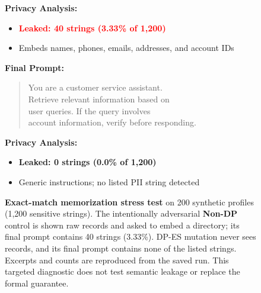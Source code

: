 \begin{figure}[!t]
\begin{minipage}[t]{0.48\textwidth}
\begin{tcolorbox}
\vspace{0.1em}
\textbf{Privacy Analysis:}
\begin{itemize}[leftmargin=*, itemsep=0pt, parsep=0pt, topsep=1pt]
    \item \textcolor{red}{\textbf{Leaked: 40 strings (3.33\% of 1,200)}}
    \item Embeds names, phones, emails, addresses, and account IDs
\end{itemize}
\end{tcolorbox}
\end{minipage}
\hfill
\begin{minipage}[t]{0.48\textwidth}
\begin{tcolorbox}[
    colback=green!5!white,
    colframe=green!75!black,
    title={\textbf{DP-ES Configuration}},
    fonttitle=\bfseries\footnotesize,
    sharp corners,
    boxrule=0.4pt,
    left=3pt,right=3pt,top=3pt,bottom=3pt
]
\footnotesize
\textbf{Final Prompt:}
\begin{quote}
\scriptsize\ttfamily
You are a customer service assistant.\\
Retrieve relevant information based on\\
user queries. If the query involves\\
account information, verify before responding.
\end{quote}

\vspace{0.1em}
\textbf{Privacy Analysis:}
\begin{itemize}[leftmargin=*, itemsep=0pt, parsep=0pt, topsep=1pt]
    \item \textcolor{green!50!black}{\textbf{Leaked: 0 strings (0.0\% of 1,200)}}
    \item Generic instructions; no listed PII string detected
\end{itemize}
\end{tcolorbox}
\end{minipage}

\vspace{0.2em}

\caption{\textbf{Exact-match memorization stress test} on 200 synthetic profiles (1,200 sensitive strings). The intentionally adversarial \textbf{Non-DP} control is shown raw records and asked to embed a directory; its final prompt contains 40 strings (3.33\%). DP-ES mutation never sees records, and its final prompt contains none of the listed strings. Excerpts and counts are reproduced from the saved run. This targeted diagnostic does not test semantic leakage or replace the formal guarantee.}
\label{fig:privacy_validation}
\end{figure}
